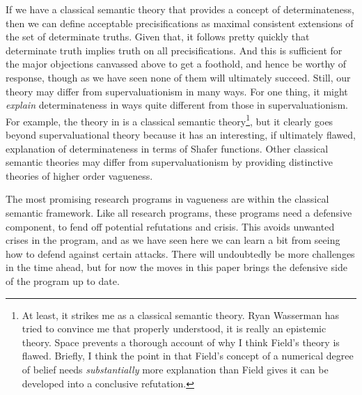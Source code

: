 If we have a classical semantic theory that provides a concept of determinateness, then we can define acceptable precisifications as maximal consistent extensions of the set of determinate truths. Given that, it follows pretty quickly that determinate truth implies truth on all precisifications. And this is sufficient for the major objections canvassed above to get a foothold, and hence be worthy of response, though as we have seen none of them will ultimately succeed. Still, our theory may differ from supervaluationism in many ways. For one thing, it might \textit{explain} determinateness in ways quite different from those in supervaluationism. For example, the theory in \citet{Field2000} is a classical semantic theory\footnote{At least, it strikes me as a classical semantic theory. Ryan Wasserman has tried to convince me that properly understood, it is really an epistemic theory. Space prevents a thorough account of why I think Field's theory is flawed. Briefly, I think the point in \citet{Leeds2000} that Field's concept of a numerical degree of belief needs \textit{substantially} more explanation than Field gives it can be developed into a conclusive refutation.}, but it clearly goes beyond supervaluational theory because it has an interesting, if ultimately flawed, explanation of determinateness in terms of Shafer functions. Other classical semantic theories may differ from supervaluationism by providing distinctive theories of higher order vagueness.

The most promising research programs in vagueness are within the classical semantic framework. Like all research programs, these programs need a defensive component, to fend off potential refutations and crisis. This avoids unwanted crises in the program, and as we have seen here we can learn a bit from seeing how to defend against certain attacks. There will undoubtedly be more challenges in the time ahead, but for now the moves in this paper brings the defensive side of the program up to date.






